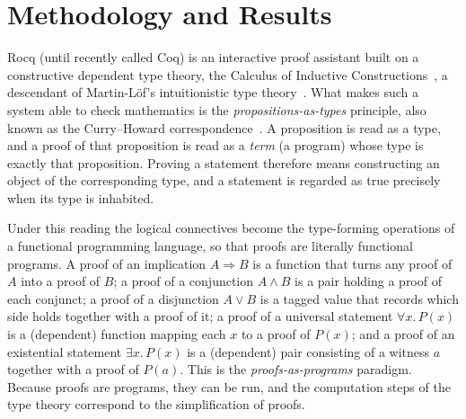 \section{Methodology and Results}\label{sec:methodology}

Rocq (until
recently called Coq) is an interactive proof assistant built on a constructive
dependent type theory, the Calculus of Inductive
Constructions~\cite{CoquandHuet1988,CoqArt}, a descendant of Martin-L\"of's
intuitionistic type theory~\cite{MartinLof1984}. What makes such a system able to
check mathematics is the \emph{propositions-as-types} principle, also known as the
Curry--Howard correspondence~\cite{Howard1980}. A proposition is read as a type, and
a proof of that proposition is read as a \emph{term} (a program) whose type is
exactly that proposition. Proving a statement therefore means constructing an object of the
corresponding type, and a statement is regarded as true precisely when its type is
inhabited.

Under this reading the logical connectives become the type-forming operations of a
functional programming language, so that proofs are literally functional programs.
A proof of an implication $A \Rightarrow B$ is a function that turns any proof of
$A$ into a proof of $B$; a proof of a conjunction $A \wedge B$ is a pair holding a
proof of each conjunct; a proof of a disjunction $A \vee B$ is a tagged value that
records which side holds together with a proof of it; a proof of a universal
statement $\forall x.\,P(x)$ is a (dependent) function mapping each $x$ to a proof
of $P(x)$; and a proof of an existential statement $\exists x.\,P(x)$ is a
(dependent) pair consisting of a witness $a$ together with a proof of $P(a)$. This
is the \emph{proofs-as-programs} paradigm. Because proofs are programs, they can be
run, and the computation steps of the type theory correspond to the simplification
of proofs. 

